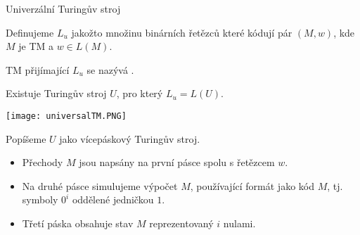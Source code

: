     
    
    
    \begin{frame}{Univerzální Turingův stroj}
    \begin{definition}
    Definujeme  $L_u$ jakožto množinu binárních řetězců které kódují pár $(M,w)$, kde $M$ je TM a $w \in L(M)$.
    
    TM přijímající $L_u$ se nazývá .
    \end{definition}
    \pause
    \begin{theorem}
    Existuje Turingův stroj $U$, pro který $L_u=L(U)$.
    \end{theorem}
    \begin{minipage}{0.37\textwidth}
    \texttt{[image: universalTM.PNG]}
    \end{minipage}
    \begin{minipage}{0.01\textwidth}
    \end{minipage}
    \begin{minipage}{0.61\textwidth}
    Popíšeme $U$ jako vícepáskový Turingův stroj.
    \begin{itemize}[<+->]
        \item Přechody $M$ jsou napsány na první pásce spolu s řetězcem $w$.
        \item Na druhé pásce simulujeme výpočet $M$, používající formát jako kód $M$, tj. symboly $0^i$ oddělené jedničkou $1$.
        \item Třetí páska obsahuje stav $M$ reprezentovaný $i$ nulami.
    \end{itemize}
    \end{minipage}
    \end{frame}
    

